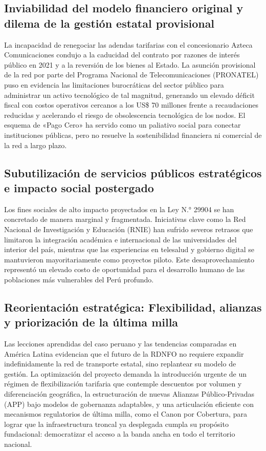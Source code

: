 \subsection*{Inviabilidad del modelo financiero original y dilema de la gestión estatal provisional}
La incapacidad de renegociar las adendas tarifarias con el concesionario Azteca Comunicaciones condujo a la caducidad del contrato por razones de interés público en 2021 y a la reversión de los bienes al Estado. La asunción provisional de la red por parte del Programa Nacional de Telecomunicaciones (PRONATEL) puso en evidencia las limitaciones burocráticas del sector público para administrar un activo tecnológico de tal magnitud, generando un elevado déficit fiscal con costos operativos cercanos a los US\$ 70 millones frente a recaudaciones reducidas y acelerando el riesgo de obsolescencia tecnológica de los nodos. El esquema de «Pago Cero» ha servido como un paliativo social para conectar instituciones públicas, pero no resuelve la sostenibilidad financiera ni comercial de la red a largo plazo.

\subsection*{Subutilización de servicios públicos estratégicos e impacto social postergado}
Los fines sociales de alto impacto proyectados en la Ley N.° 29904 se han concretado de manera marginal y fragmentada. Iniciativas clave como la Red Nacional de Investigación y Educación (RNIE) han sufrido severos retrasos que limitaron la integración académica e internacional de las universidades del interior del país, mientras que las experiencias en telesalud y gobierno digital se mantuvieron mayoritariamente como proyectos piloto. Este desaprovechamiento representó un elevado costo de oportunidad para el desarrollo humano de las poblaciones más vulnerables del Perú profundo.

\subsection*{Reorientación estratégica: Flexibilidad, alianzas y priorización de la última milla}
Las lecciones aprendidas del caso peruano y las tendencias comparadas en América Latina evidencian que el futuro de la RDNFO no requiere expandir indefinidamente la red de transporte estatal, sino replantear su modelo de gestión. La optimización del proyecto demanda la introducción urgente de un régimen de flexibilización tarifaria que contemple descuentos por volumen y diferenciación geográfica, la estructuración de nuevas Alianzas Público-Privadas (APP) bajo modelos de gobernanza adaptables, y una articulación eficiente con mecanismos regulatorios de última milla, como el Canon por Cobertura, para lograr que la infraestructura troncal ya desplegada cumpla su propósito fundacional: democratizar el acceso a la banda ancha en todo el territorio nacional.